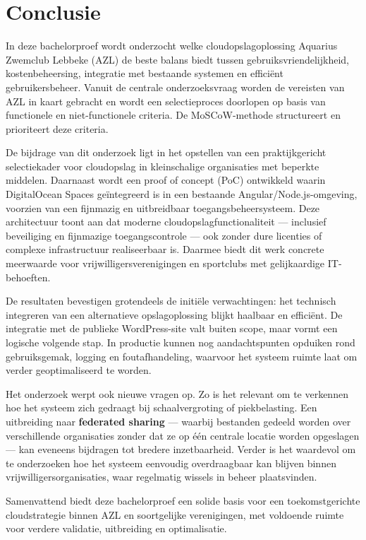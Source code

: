 
\chapter{Conclusie}
\label{ch:conclusie}

In deze bachelorproef wordt onderzocht welke cloudopslagoplossing Aquarius Zwemclub Lebbeke (AZL) de beste balans biedt tussen gebruiksvriendelijkheid, kostenbeheersing, integratie met bestaande systemen en efficiënt gebruikersbeheer. Vanuit de centrale onderzoeksvraag worden de vereisten van AZL in kaart gebracht en wordt een selectieproces doorlopen op basis van functionele en niet-functionele criteria. De MoSCoW-methode structureert en prioriteert deze criteria.

De bijdrage van dit onderzoek ligt in het opstellen van een praktijkgericht selectiekader voor cloudopslag in kleinschalige organisaties met beperkte middelen. Daarnaast wordt een proof of concept (PoC) ontwikkeld waarin DigitalOcean Spaces geïntegreerd is in een bestaande Angular/Node.js-omgeving, voorzien van een fijnmazig en uitbreidbaar toegangsbeheersysteem. Deze architectuur toont aan dat moderne cloudopslagfunctionaliteit — inclusief beveiliging en fijnmazige toegangscontrole — ook zonder dure licenties of complexe infrastructuur realiseerbaar is. Daarmee biedt dit werk concrete meerwaarde voor vrijwilligersverenigingen en sportclubs met gelijkaardige IT-behoeften.

De resultaten bevestigen grotendeels de initiële verwachtingen: het technisch integreren van een alternatieve opslagoplossing blijkt haalbaar en efficiënt. De integratie met de publieke WordPress-site valt buiten scope, maar vormt een logische volgende stap. In productie kunnen nog aandachtspunten opduiken rond gebruiksgemak, logging en foutafhandeling, waarvoor het systeem ruimte laat om verder geoptimaliseerd te worden.

Het onderzoek werpt ook nieuwe vragen op. Zo is het relevant om te verkennen hoe het systeem zich gedraagt bij schaalvergroting of piekbelasting. Een uitbreiding naar \textbf{federated sharing} — waarbij bestanden gedeeld worden over verschillende organisaties zonder dat ze op één centrale locatie worden opgeslagen — kan eveneens bijdragen tot bredere inzetbaarheid. Verder is het waardevol om te onderzoeken hoe het systeem eenvoudig overdraagbaar kan blijven binnen vrijwilligersorganisaties, waar regelmatig wissels in beheer plaatsvinden.

Samenvattend biedt deze bachelorproef een solide basis voor een toekomstgerichte cloudstrategie binnen AZL en soortgelijke verenigingen, met voldoende ruimte voor verdere validatie, uitbreiding en optimalisatie.
